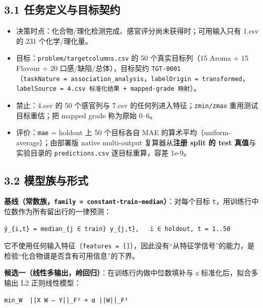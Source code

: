 \documentclass[
  11pt,
]{ctexart}
\providecommand{\tightlist}{%
  \setlength{\itemsep}{0pt}\setlength{\parskip}{0pt}}
\begin{document}
\subsection{3.1
任务定义与目标契约}\label{ux4efbux52a1ux5b9aux4e49ux4e0eux76eeux6807ux5951ux7ea6}

\begin{itemize}
\tightlist
\item
  决策时点：化合物/理化检测完成、感官评分尚未获得时；可用输入只有 1.csv
  的 231 个化学/理化量。
\item
  目标：\texttt{problem/\allowbreak{}targetcolumns.\allowbreak{}csv} 的 50 个真实目标列（15 Aroma
  + 15 Flavour + 20 口感/缺陷/总体），目标契约
  \texttt{TGT-0001}（\texttt{taskNature\ =\ association\_\allowbreak{}analysis}，\texttt{labelOrigin\ =\ transformed}，\texttt{labelSource\ =\ 4.\allowbreak{}csv\ 标准化结果\ +\ mapped-grade\ 映射}）。
\item
  禁止：4.csv 的 50 个感官列与 7.csv
  的任何列进入特征；\texttt{zmin/zmax} 重用测试目标重估；把 mapped grade
  称为原始 0--6。
\item
  评价：\texttt{mae} = holdout 上 50 个目标各自 MAE
  的算术平均（uniform-average）；由部署版 native multi-output
  复算器从\textbf{注册 split 的 test 真值}与实验目录的
  \texttt{predictions.\allowbreak{}csv} 逐目标重算，容差 1e-9。
\end{itemize}

\subsection{3.2
模型族与形式}\label{ux6a21ux578bux65cfux4e0eux5f62ux5f0f}

\textbf{基线（常数族，\texttt{family\ =\ constant-train-median}）}：对每个目标
\texttt{t}，用训练行中位数作为所有留出行的一律预测：

\begin{verbatim}
ŷ_{i,t} = median_{j ∈ train} y_{j,t},   i ∈ holdout, t = 1..50
\end{verbatim}

它不使用任何输入特征（\texttt{features\ =\ {[}{]}}），因此没有``从特征学信号''的能力，是检验``化合物谱是否含有可用信息''的下界。

\textbf{候选一（线性多输出，岭回归）}：在训练行内做中位数填补与 z
标准化后，拟合多输出 L2 正则线性模型：

\begin{verbatim}
min_W  ||X W − Y||_F² + α ||W||_F²
\end{verbatim}
\end{document}
